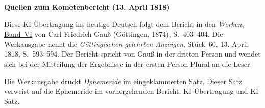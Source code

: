 \clearpage\thispagestyle{empty}
\begin{center}\textbf{Quellen zum Kometenbericht (13. April 1818)}\end{center}
\noindent Diese KI-Übertragung ins heutige Deutsch folgt dem Bericht in den \href{https://gdz.sub.uni-goettingen.de/id/PPN236007467}{\textit{Werken}, Band~VI} von Carl Friedrich Gauß (Göttingen, 1874), S.~403--404. Die Werkausgabe nennt die \textit{Göttingischen gelehrten Anzeigen}, Stück~60, 13. April 1818, S.~593--594. Der Bericht spricht von Gauß in der dritten Person und wendet sich bei der Mitteilung der Ergebnisse in der ersten Person Plural an die Leser.
\par\smallskip\noindent Die Werkausgabe druckt \textit{Dphemeride} im eingeklammerten Satz. Dieser Satz verweist auf die Ephemeride im vorhergehenden Bericht. KI-Übertragung und KI-Satz.
\clearpage
